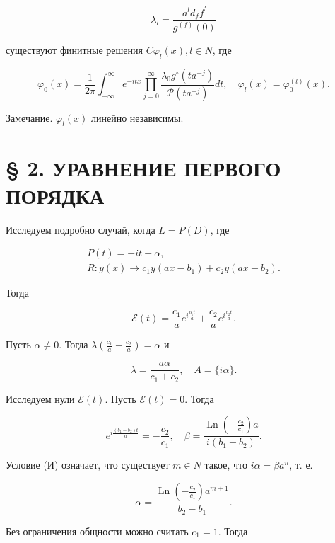 \documentclass[10pt]{article}
\begin{document}
$$
\lambda_{l}=\frac{a^{l} d_{f} f^{\prime}}{g^{(f)}(0)}
$$

существуют финитные решения $C \varphi_{l}(x), l \in N$, где

$$
\varphi_{0}(x)=\frac{1}{2 \pi} \int_{-\infty}^{\infty} e^{-i t x} \prod_{j=0}^{\infty} \frac{\lambda_{0} g^{\circ}\left(t a^{-j}\right)}{\mathscr{P}\left(t a^{-j}\right)} d t, \quad \varphi_{l}(x)=\varphi_{0}^{(l)}(x) .
$$

Замечание. $\varphi_{l}(x)$ линейно независимы.

\section*{§ 2. УРАВНЕНИЕ ПЕРВОГО ПОРЯДКА}
Исследуем подробно случай, когда $L=P(D)$, где


\begin{gather*}
P(t)=-i t+\alpha,  \tag{3.13}\\
R: y(x) \rightarrow c_{1} y\left(a x-b_{1}\right)+c_{2} y\left(a x-b_{2}\right) . \tag{3.14}
\end{gather*}


Тогда

$$
\mathscr{E}(t)=\frac{c_{1}}{a} e^{i \frac{b_{1} t}{a}}+\frac{c_{2}}{a} e^{i \frac{b_{2} t}{a}} .
$$

Пусть $\alpha \neq 0$. Тогда $\lambda\left(\frac{c_{1}}{a}+\frac{c_{2}}{a}\right)=\alpha$ и


\begin{equation*}
\lambda=\frac{a \alpha}{c_{1}+c_{2}}, \quad A=\{i \alpha\} . \tag{3.15}
\end{equation*}


Исследуем нули $\mathscr{E}(t)$. Пусть $\mathscr{E}(t)=0$. Тогда


\begin{equation*}
e^{i \frac{\left(b_{1}-b_{2}\right) t}{a}}=-\frac{c_{2}}{c_{1}}, \quad \beta=\frac{\operatorname{Ln}\left(-\frac{c_{2}}{c_{1}}\right) a}{i\left(b_{1}-b_{2}\right)} . \tag{3.16}
\end{equation*}


Условие (И) означает, что существует $m \in N$ такое, что $i \alpha=\beta a^{n}$, т. е.


\begin{equation*}
\alpha=\frac{\operatorname{Ln}\left(-\frac{c_{2}}{c_{1}}\right) a^{m+1}}{b_{2}-b_{1}} . \tag{3.17}
\end{equation*}


Без ограничения общности можно считать $c_{1}=1$. Тогда
\end{document}
